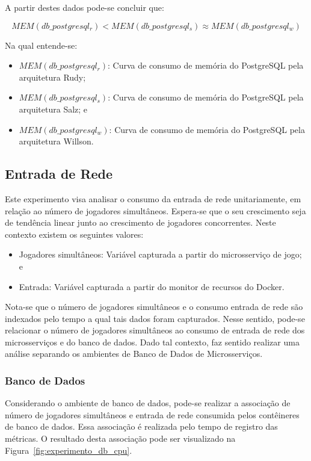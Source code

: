 A partir destes dados pode-se concluir que:

$$
    MEM(db\_postgresql_{r}) < MEM(db\_postgresql_{s}) \approx MEM(db\_postgresql_{w})
$$

Na qual entende-se:

\begin{itemize}
\item $MEM(db\_postgresql_{r})$: Curva de consumo de memória do PostgreSQL pela arquitetura Rudy;
\item $MEM(db\_postgresql_{s})$: Curva de consumo de memória do PostgreSQL pela arquitetura Salz; e
\item $MEM(db\_postgresql_{w})$: Curva de consumo de memória do PostgreSQL pela arquitetura Willson.
\end{itemize}

\subsection{Entrada de Rede}

Este experimento visa analisar o consumo da entrada de rede unitariamente, em relação ao número de jogadores simultâneos.
%
Espera-se que o seu crescimento seja de tendência linear junto ao crescimento de jogadores concorrentes.
%
Neste contexto existem os seguintes valores:

\begin{itemize}
    \item Jogadores simultâneos: Variável capturada a partir do microsserviço de jogo; e
    \item Entrada: Variável capturada a partir do monitor de recursos do Docker.
\end{itemize}

Nota-se que o número de jogadores simultâneos e o consumo entrada de rede são indexados pelo tempo a qual tais dados foram capturados.
%
Nesse sentido, pode-se relacionar o número de jogadores simultâneos ao consumo de entrada de rede dos microsserviços e do banco de dados.
%
Dado tal contexto, faz sentido realizar uma análise separando os ambientes de Banco de Dados de Microsserviços.

\subsubsection{Banco de Dados}

Considerando o ambiente de banco de dados, pode-se realizar a associação de número de jogadores simultâneos e entrada de rede consumida pelos contêineres de banco de dados.
%
Essa associação é realizada pelo tempo de registro das métricas.
%
O resultado desta associação pode ser visualizado na Figura~\ref{fig:experimento_db_cpu}.
